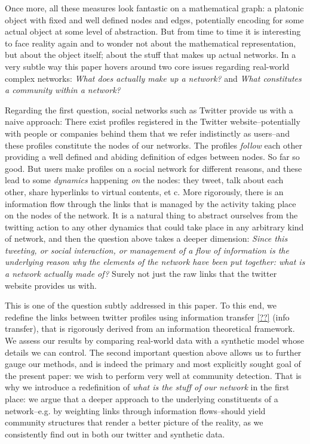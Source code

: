 \documentclass[12pt]{article}
\begin{document}
    Once more, all these measures look fantastic on a mathematical graph: a platonic object with
fixed and well defined nodes and edges, potentially encoding for some actual object at some level of
abstraction. But from time to time it is interesting to face reality again and to wonder not about
the mathematical representation, but about the object itself; about the stuff that makes up actual
networks. In a very subtle way this paper hovers around two core issues regarding real-world complex
networks: \emph{What does actually make up a network?} and \emph{What constitutes a community within
a network?}

    Regarding the first question, social networks such as Twitter provide us with a naive approach:
There exist profiles registered in the Twitter website--potentially with people or companies behind
them that we refer indistinctly as users--and these profiles constitute the nodes of our networks.
The profiles \emph{follow} each other providing a well defined and abiding definition of edges
between nodes. So far so good. But users make profiles on a social network for different reasons,
and these lead to some \emph{dynamics} happening \emph{on} the nodes: they tweet, talk about each
other, share hyperlinks to virtual contents, et c. More rigorously, there is an information flow
through the links that is managed by the activity taking place on the nodes of the network. It is a
natural thing to abstract ourselves from the twitting action to any other dynamics that could take
place in any arbitrary kind of network, and then the question above takes a deeper dimension:
\emph{Since this tweeting, or social interaction, or management of a flow of information is the
underlying reason why the elements of the network have been put together: what is a network actually
made of?} Surely not just the raw links that the twitter website provides us with.

    This is one of the question subtly addressed in this paper. To this end, we redefine the links
between twitter profiles using information transfer \ref{??} (info transfer), that is rigorously
derived from an information theoretical framework. We assess our results by comparing real-world
data with a synthetic model whose details we can control. The second important question above allows
us to further gauge our methods, and is indeed the primary and most explicitly sought goal of the
present paper: we wish to perform very well at community detection. That is why we introduce a
redefinition of \emph{what is the stuff of our network} in the first place: we argue that a deeper
approach to the underlying constituents of a network--e.g. by weighting links through information
flows--should yield community structures that render a better picture of the reality, as we
consistently find out in both our twitter and synthetic data.
\end{document}
